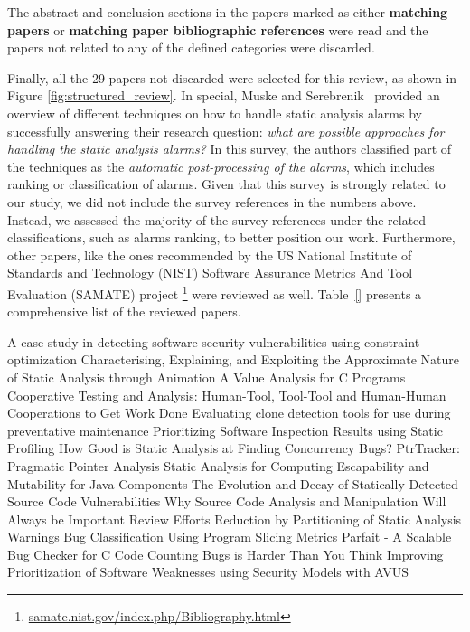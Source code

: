 The abstract and conclusion sections in the papers marked as either
\textbf{matching papers} or \textbf{matching paper bibliographic references} were read and the
papers not related to any of the defined categories were discarded.

Finally, all the 29 papers not discarded were selected for this review, as
shown in Figure \ref{fig:structured_review}. In special, Muske and
Serebrenik~\cite{muske2016survey} provided an overview of different techniques
on how to handle static analysis alarms by successfully answering their
research question: \textit{what are possible approaches for handling the static
analysis alarms?} In this survey, the authors classified part of the techniques
as the \textit{automatic post-processing of the alarms}, which includes ranking
or classification of alarms. Given that this survey is strongly related to our
study, we did not include the survey references in the numbers above. Instead,
we assessed the majority of the survey references under the related
classifications, such as alarms ranking, to better position our work.
Furthermore, other papers, like the ones recommended by the US National
Institute of Standards and Technology (NIST) Software Assurance Metrics And
Tool Evaluation (SAMATE) project
\footnote{\url{samate.nist.gov/index.php/Bibliography.html}} were reviewed as
well. Table~\ref{} presents a comprehensive list of the reviewed papers.


A case study in detecting software security vulnerabilities using constraint optimization
Characterising, Explaining, and Exploiting the Approximate Nature of Static Analysis through Animation
A Value Analysis for C Programs
Cooperative Testing and Analysis: Human-Tool, Tool-Tool and Human-Human Cooperations to Get Work Done
Evaluating clone detection tools for use during preventative maintenance
Prioritizing Software Inspection Results using Static Profiling
How Good is Static Analysis at Finding Concurrency Bugs?
PtrTracker: Pragmatic Pointer Analysis
Static Analysis for Computing Escapability and Mutability for Java Components
The Evolution and Decay of Statically Detected Source Code Vulnerabilities
Why Source Code Analysis and Manipulation Will Always be Important
Review Efforts Reduction by Partitioning of Static Analysis Warnings
Bug Classification Using Program Slicing Metrics
Parfait - A Scalable Bug Checker for C Code
Counting Bugs is Harder Than You Think
Improving Prioritization of Software Weaknesses using Security Models with AVUS
~\cite{muske2016survey}

